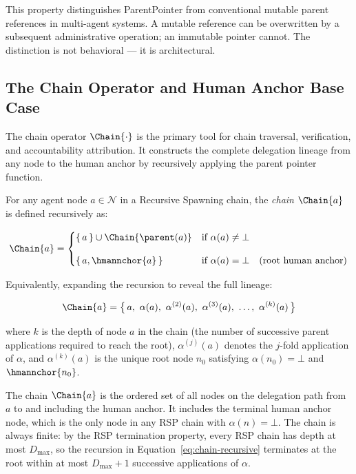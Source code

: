 This property distinguishes ParentPointer from conventional mutable parent references in multi-agent systems. A mutable reference can be overwritten by a subsequent administrative operation; an immutable pointer cannot. The distinction is not behavioral — it is architectural.

\subsection{The Chain Operator and Human Anchor Base Case}
\label{sec:chain-operator-definition}

The chain operator $\Chain{\cdot}$ is the primary tool for chain traversal, verification, and accountability attribution. It constructs the complete delegation lineage from any node to the human anchor by recursively applying the parent pointer function.

\begin{dfn}
\label{def:chain-operator}
For any agent node $a \in \mathcal{N}$ in a Recursive Spawning chain, the \emph{chain} $\Chain{a}$ is defined recursively as:

\begin{equation}
\Chain{a} =
\begin{cases}
\{\,a\,\} \cup \Chain{\parent(a)} & \text{if } \alpha(a) \neq \bot \\[10pt]
\{\,a,\hmannchor{a}\,\} & \text{if } \alpha(a) = \bot \quad \text{(root human anchor)}
\end{cases}
\label{eq:chain-recursive}
\end{equation}

Equivalently, expanding the recursion to reveal the full lineage:

\begin{equation}
\Chain{a} = \bigl\{\, a,\ \alpha(a),\ \alpha^{(2)}(a),\ \alpha^{(3)}(a),\ \ldots,\ \alpha^{(k)}(a) \,\bigr\}
\label{eq:chain-expanded}
\end{equation}

where $k$ is the depth of node $a$ in the chain (the number of successive parent applications required to reach the root), $\alpha^{(j)}(a)$ denotes the $j$-fold application of $\alpha$, and $\alpha^{(k)}(a)$ is the unique root node $n_0$ satisfying $\alpha(n_0) = \bot$ and $\hmannchor{n_0}$.
\end{dfn}

The chain $\Chain{a}$ is the ordered set of all nodes on the delegation path from $a$ to and including the human anchor. It includes the terminal human anchor node, which is the only node in any RSP chain with $\alpha(n) = \bot$. The chain is always finite: by the RSP termination property, every RSP chain has depth at most $D_{\max}$, so the recursion in Equation~\ref{eq:chain-recursive} terminates at the root within at most $D_{\max} + 1$ successive applications of $\alpha$.

